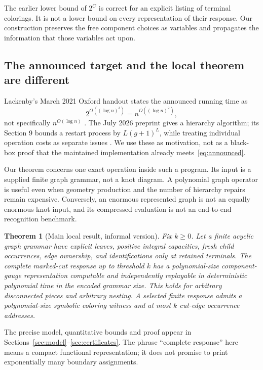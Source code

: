 \documentclass[11pt,letterpaper]{article}
\newtheorem{theorem}{Theorem}[section]
\theoremstyle{definition}
\theoremstyle{remark}\newtheorem{remark}[theorem]{Remark}
\begin{document}
The earlier lower bound of $2^C$ is correct for an explicit listing of terminal colorings. It is not a lower bound on every representation of their response. Our construction preserves the free component choices as variables and propagates the information that those variables act upon.

\subsection{The announced target and the local theorem are different}
Lackenby's March 2021 Oxford handout states the announced running time as
\begin{equation}\label{eq:announced}
 2^{O((\log n)^3)}=n^{O((\log n)^2)},
\end{equation}
not specifically $n^{O(\log n)}$ \cite[slides 7 and 25]{talk}. The July 2026 preprint gives a hierarchy algorithm; its Section 9 bounds a restart process by $L(g+1)^L$, while treating individual operation costs as separate issues \cite{lackenby}. We use these as motivation, not as a black-box proof that the maintained implementation already meets~\eqref{eq:announced}.

Our theorem concerns one exact operation inside such a program. Its input is a supplied finite graph grammar, not a knot diagram. A polynomial graph operator is useful even when geometry production and the number of hierarchy repairs remain expensive. Conversely, an enormous represented graph is not an equally enormous knot input, and its compressed evaluation is not an end-to-end recognition benchmark.

\begin{theorem}[Main local result, informal version]\label{thm:main-intro}
Fix $k\ge0$. Let a finite acyclic graph grammar have explicit leaves, positive integral capacities, fresh child occurrences, edge ownership, and identifications only at retained terminals. The complete marked-cut response up to threshold $k$ has a polynomial-size component-gauge representation computable and independently replayable in deterministic polynomial time in the encoded grammar size. This holds for arbitrary disconnected pieces and arbitrary nesting. A selected finite response admits a polynomial-size symbolic coloring witness and at most $k$ cut-edge occurrence addresses.
\end{theorem}
The precise model, quantitative bounds and proof appear in Sections~\ref{sec:model}--\ref{sec:certificates}. The phrase ``complete response'' here means a compact functional representation; it does not promise to print exponentially many boundary assignments.
\end{document}

